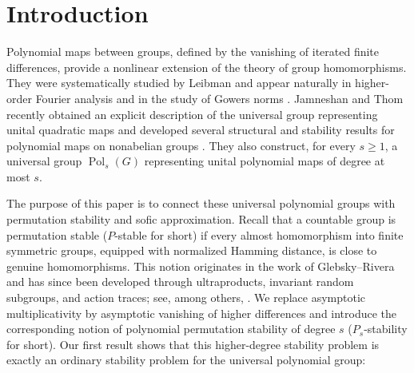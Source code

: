 \documentclass[a4paper,12pt]{amsart}
\theoremstyle{plain}
\theoremstyle{definition}
\theoremstyle{remark}
\numberwithin{equation}{subsection}
\DeclareMathOperator{\Pold}{Pol}
\begin{document}

\maketitle

\section{Introduction}
\label{s:intro}

\noindent
Polynomial maps between groups, defined by the vanishing of iterated
finite differences, provide a nonlinear extension of the theory of group
homomorphisms.  They were systematically studied by Leibman
\cite{Lei02} and appear naturally in higher-order Fourier analysis and in
the study of Gowers norms \cite{GT12,GTZ12,JT24}.
Jamneshan and Thom recently obtained an
explicit description of the universal group representing unital
quadratic maps and developed several structural and stability results for
polynomial maps on nonabelian groups \cite{JT24}.  They also construct, for every $s\geq1$, a universal group $\Pold_s(G)$
representing unital polynomial maps of degree at most $s$.

The purpose of this paper is to connect these universal polynomial groups
with permutation stability and sofic approximation.  Recall that a
countable group is permutation stable ($P$-stable for short) if every almost homomorphism into
finite symmetric groups, equipped with normalized Hamming distance, is
close to genuine homomorphisms.  This notion originates in the work of
Glebsky--Rivera \cite{GR09} and has since been developed through
ultraproducts, invariant random subgroups, and action traces; see, among
others, \cite{AP15,BLT19,AP24}.  We replace asymptotic multiplicativity by
asymptotic vanishing of higher differences and introduce the corresponding
notion of polynomial permutation stability of degree $s$ ($P_s$-stability for short). Our first result shows that this higher-degree stability problem is exactly
an ordinary stability problem for the universal polynomial group:
\end{document}
